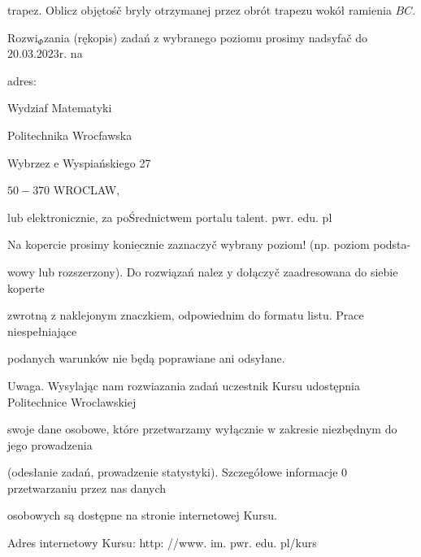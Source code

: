 \documentclass[a4paper,12pt]{article}
\begin{document}
trapez. Oblicz objętośč bryly otrzymanej przez obrót trapezu wokół ramienia $BC.$

$\mathrm{R}\mathrm{o}\mathrm{z}\mathrm{w}\mathrm{i}_{\Phi}$zania (rękopis) zadań $\mathrm{z}$ wybranego poziomu prosimy nadsyfač do $20.03.2023\mathrm{r}$. na

adres:

Wydziaf Matematyki

Politechnika Wrocfawska

Wybrzez $\mathrm{e}$ Wyspiańskiego 27

$50-370$ WROCLAW,

$\mathrm{l}\mathrm{u}\mathrm{b}$ elektronicznie, za poŚrednictwem portalu talent. $\mathrm{p}\mathrm{w}\mathrm{r}$. edu. pl

Na kopercie prosimy $\underline{\mathrm{k}\mathrm{o}\mathrm{n}\mathrm{i}\mathrm{e}\mathrm{c}\mathrm{z}\mathrm{n}\mathrm{i}\mathrm{e}}$ zaznaczyč wybrany poziom! (np. poziom podsta-

wowy lub rozszerzony). Do rozwiązań nalez $\mathrm{y}$ dołączyč zaadresowana do siebie koperte

zwrotną $\mathrm{z}$ naklejonym znaczkiem, odpowiednim do formatu listu. Prace niespełniające

podanych warunków nie będą poprawiane ani odsyłane.

Uwaga. Wysylając nam rozwiazania zadań uczestnik Kursu udostępnia Politechnice Wroclawskiej

swoje dane osobowe, które przetwarzamy wyłącznie $\mathrm{w}$ zakresie niezbędnym do jego prowadzenia

(odesłanie zadań, prowadzenie statystyki). Szczegółowe informacje $0$ przetwarzaniu przez nas danych

osobowych są dostępne na stronie internetowej Kursu.

Adres internetowy Kursu: http: //www. im. pwr. edu. pl/kurs
\end{document}
